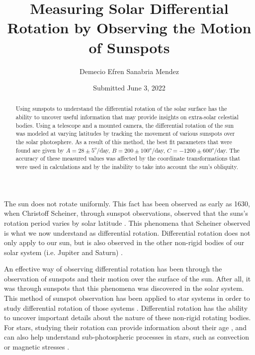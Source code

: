 \documentclass[aps,twocolumn,showpacs,preprintnumbers]{revtex4}
\begin{document}
\title{Measuring Solar Differential Rotation by Observing the Motion of Sunspots}

\author{Demecio Efren Sanabria Mendez}


\date{Submitted June 3, 2022}

\begin{abstract}  

Using sunspots to understand the differential rotation of the solar surface has the ability to uncover useful information that may provide insights on extra-solar celestial bodies. Using a telescope and a mounted camera, the differential rotation of the sun was modeled at varying latitudes by tracking the movement of various sunspots over the solar photosphere. As a result of this method, the best fit parameters that were found are given by $A = 28 \pm 5 ^o$/day, $B = 200 \pm 100 ^o$/day, $C = -1200 \pm 600 ^o$/day. The accuracy of these measured values was affected by the coordinate transformations that were used in calculations and by the inability to take into account the sun's obliquity.

\end{abstract}


\maketitle 


The sun does not rotate uniformly. This fact has been observed as early as 1630, when Christoff Scheiner, through sunspot observations, observed that the suns's rotation period varies by solar latitude \cite{Paterno_2010}. This phenomena that Scheiner observed is what we now understand as differential rotation. Differential rotation does not only apply to our sun, but is also observed in the other non-rigid bodies of our solar system (i.e. Jupiter and Saturn) \cite{glatz_2009}. 

An effective way of observing differential rotation has been through the observation of sunspots and their motion over the surface of the sun. After all, it was through sunspots that this phenomena was discovered in the solar system. This method of sunspot observation has been applied to star systems in order to study differential rotation of those systems \cite{JRA_2015}. Differential rotation has the ability to uncover important details about the nature of these non-rigid rotating bodies. For stars, studying their rotation can provide information about their age \cite{Reinhold_2015}, and can also help understand sub-photospheric processes in stars, such as convection or magnetic stresses \cite{Volland_1992}.
\end{document}
